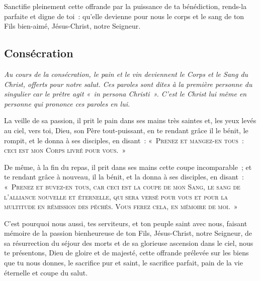 Sanctifie pleinement cette offrande  par la puissance de ta bénédiction,
rends-la parfaite et digne de toi~: qu'elle devienne pour nous le corps et
le sang de ton Fils bien-aimé, Jésus-Christ, notre Seigneur.

\subsection*{Consécration}

\emph{Au cours de la consécration, le pain et le vin deviennent le              
Corps et le Sang du Christ, offerts pour notre salut. Ces paroles sont          
dites à la première personne du singulier car le prêtre agit «~in               
persona Christi~». C'est le Christ lui même en personne qui prononce            
ces paroles en lui.}

La veille de sa passion, il prit le pain dans ses mains très saintes 
et, les yeux levés au ciel, vers toi, Dieu, son Père tout-puissant, en
te rendant grâce il le bénit, le rompit, et le donna à ses disciples,
en disant~: \textsc{«~Prenez et mangez-en tous~:  ceci est mon Corps             
livré pour vous.~»}


De même, à la fin du repas,  il prit dans ses mains cette coupe
incomparable~; et te rendant grâce à nouveau, il la bénit, et la donna
à ses disciples, en disant~: \textsc{«~Prenez et buvez-en tous,  car             
ceci est la coupe de mon Sang, le sang de l'alliance nouvelle et
éternelle, qui sera versé pour vous et pour la multitude en rémission
des péchés. Vous ferez cela, en mémoire de moi.~»}





C'est pourquoi nous aussi, tes serviteurs, et ton peuple saint avec
nous, faisant mémoire de la passion bienheureuse de ton Fils,
Jésus-Christ, notre Seigneur, de sa résurrection du séjour des morts
et de sa glorieuse ascension dans le ciel, nous te présentons, Dieu de
gloire et de majesté, cette offrande prélevée sur les biens que tu
nous donnes, le sacrifice pur et saint, le sacrifice parfait, pain de
la vie éternelle et coupe du salut.

